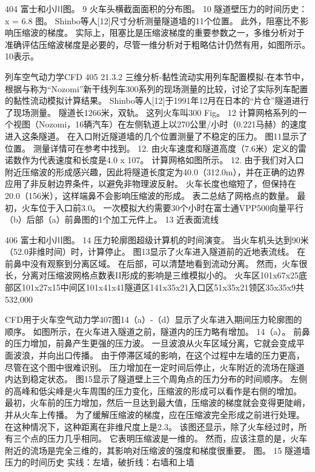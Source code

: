 \documentclass[UTF8,11pt,a4paper,openany,fontset=fandol]{ctexbook}
\begin{document}
404 富士和小川图。 9 火车头横截面面积的分布图。 10 隧道壁压力的时间历史：x = 6.8 图。 Shinbo等人[12]尺寸分析测量隧道墙的11个位置。 此外，阻塞比不影响压缩波的梯度。 实际上，阻塞比是压缩波梯度的重要参数之一，多维分析对于准确评估压缩波梯度是必要的，尽管一维分析对于粗略估计仍然有用，如图所示。 10表示。

列车空气动力学CFD 405 21.3.2 三维分析-黏性流动实用列车配置模拟-在本节中，根据与称为“Nozomi”新干线列车300系列的现场测量的比较，讨论了实际列车配置的黏性流动模拟计算结果。 Shinbo等人[12]于1991年12月在日本的“片仓”隧道进行了现场测量。 隧道长1266米，双轨。 这列火车叫300 Fig。 12 计算网格系列的一个视图（Nozomi，16辆汽车）在左侧轨道上以270公里/小时（0.221马赫）的速度进入这条隧道。 在入口附近隧道墙的几个位置测量了不稳定的压力。 图11显示了位置。 测量详情可在参考中找到。 12. 由火车速度和隧道高度（7.6米）定义的雷诺数作为代表速度和长度是4.0 x 107。 计算网格如图所示。 12. 由于我们对入口附近压缩波的形成感兴趣，因此将隧道长度定为40.0（312.0m），并在正确的边界应用了非反射边界条件，以避免非物理波反射。 火车长度也缩短了，但保持在20.0（156米），这样端鼻不会影响压缩波的形成。 表二总结了网格点的数量。 最初，火车位于入口前3.0。 一次模拟大约需要30个小时在富士通VPP500向量平行（b）后部（a）前鼻图的1个加工元件上。 13 近表面流线

406 富士和小川图。 14 压力轮廓图超级计算机的时间演变。 当火车机头达到90米（52.0非维时间）时，计算停止。 图13显示了火车进入隧道前的近地表流线。 在前鼻中没有观察到分离区域。 在后部，可以清楚地看到流动分离。 然而，火车很长，分离对压缩波网格点数表II形成的影响是三维模拟小的。 火车区101x67x25底部区101x27x15中间区101x41x41隧道区141x35x21入口区51x35x21领区35x35x9共532,000

CFD用于火车空气动力学407图14（a）-（d）显示了火车进入期间压力轮廓图的顺序。 如图所示，在火车进入隧道之前，隧道内的压力略有增加。 14（a）。 前鼻的压力增加，前鼻产生更强的压力波。 一旦波浪从火车区域分离，它就会变成平面波浪，并向出口传播。 由于停滞区域的影响，在这个过程中左墙的压力更高，尽管在这个图中很难识别。 压力增加在一定时间后停止，火车附近的流场在隧道内达到稳定状态。 图15显示了隧道壁上三个周角点的压力分布的时间顺序。 左侧的高峰和低尖峰是火车周围的压力变化，压缩波的形成可以看作是右侧的增加。 最初，火车前的压力增加，然后一旦达到最大值，压缩波的梯度就会变得更陡峭，并从火车上传播。 为了缓解压缩波的梯度，应在压缩波完全形成之前进行处理。 在这种情况下，这种距离在非维尺度上是2.3。 该图还显示，除了火车经过时，所有三个点的压力几乎相同。 它表明压缩波是一维的。 然而，应该注意的是，火车附近的流场是完全三维的，其影响对压缩波的强度和梯度很重要。 图。 15 隧道墙压力的时间历史 实线：左墙，破折线：右墙和上墙
\end{document}
